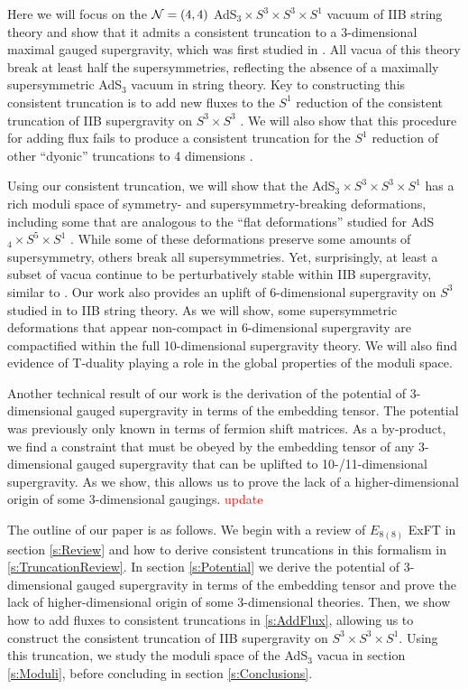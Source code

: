 \documentclass[a4paper, 11pt]{article}
\numberwithin{equation}{section}
\newcommand{\EE}{\ensuremath{E_{8(8)}}\xspace}
\newcommand{\+}{\oplus}
\newcommand{\EM}[1]{\textcolor{red}{#1}}
\begin{document}
Here we will focus on the ${\cal N}=(4,4)$ AdS$_3 \times S^3 \times S^3 \times S^1$ vacuum of IIB string theory and show that it admits a consistent truncation to a 3-dimensional maximal gauged supergravity, which was first studied in \cite{Hohm:2005ui}. All vacua of this theory break at least half the supersymmetries, reflecting the absence of a maximally supersymmetric AdS$_3$ vacuum in string theory. Key to constructing this consistent truncation is to add new fluxes to the $S^1$ reduction of the consistent truncation of IIB supergravity on $S^3 \times S^3$ \cite{Inverso:2016eet}. We will also show that this procedure for adding flux fails to produce a consistent truncation for the $S^1$ reduction of other ``dyonic'' truncations to 4 dimensions \cite{Guarino:2015jca,Inverso:2016eet}.

Using our consistent truncation, we will show that the AdS$_3 \times S^3 \times S^3 \times S^1$ has a rich moduli space of symmetry- and supersymmetry-breaking deformations, including some that are analogous to the ``flat deformations'' studied for AdS$_4 \times S^5 \times S^1$ \cite{Guarino:2020gfe,Guarino:2021hrc,Giambrone:2021zvp,Giambrone:2021wsm}. While some of these deformations preserve some amounts of supersymmetry, others break all supersymmetries. Yet, surprisingly, at least a subset of vacua continue to be perturbatively stable within IIB supergravity, similar to \cite{Giambrone:2021wsm}. Our work also provides an uplift of 6-dimensional supergravity on $S^3$ studied in \cite{Eloy:2021fhc} to IIB string theory. As we will show, some supersymmetric deformations that appear non-compact in 6-dimensional supergravity \cite{Eloy:2021fhc} are compactified within the full 10-dimensional supergravity theory. We will also find evidence of T-duality playing a role in the global properties of the moduli space.

Another technical result of our work is the derivation of the potential of 3-dimensional gauged supergravity \cite{Nicolai:2000sc,Nicolai:2001sv} in terms of the embedding tensor. The potential was previously only known in terms of fermion shift matrices. As a by-product, we find a constraint that must be obeyed by the embedding tensor of any 3-dimensional gauged supergravity that can be uplifted to 10-/11-dimensional supergravity. As we show, this allows us to prove the lack of a higher-dimensional origin of some 3-dimensional gaugings. \EM{update}

The outline of our paper is as follows. We begin with a review of $\EE$ ExFT in section \ref{s:Review} and how to derive consistent truncations in this formalism in \ref{s:TruncationReview}. In section \ref{s:Potential} we derive the potential of 3-dimensional gauged supergravity in terms of the embedding tensor and prove the lack of higher-dimensional origin of some 3-dimensional theories. Then, we show how to add fluxes to consistent truncations in \ref{s:AddFlux}, allowing us to construct the consistent truncation of IIB supergravity on $S^3 \times S^3 \times S^1$. Using this truncation, we study the moduli space of the AdS$_3$ vacua in section \ref{s:Moduli}, before concluding in section \ref{s:Conclusions}.
\end{document}
